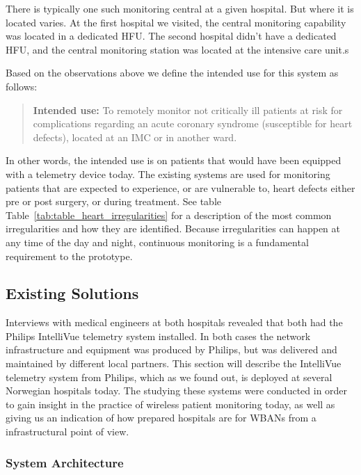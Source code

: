 There is typically one such monitoring central at a given hospital. But where it is located varies. At the first hospital we visited, the central monitoring capability was located in a dedicated HFU. The second hospital didn't have a dedicated HFU, and the central monitoring station was located at the intensive care unit.s

Based on the observations above we define the intended use for this system as follows:

\begin{quote}
\textbf{Intended use:} To remotely monitor not critically ill patients at risk for complications regarding an acute coronary syndrome (susceptible for heart defects), located at an IMC or in another ward.
\end{quote}
\noindent
In other words, the intended use is on patients that would have been equipped with a telemetry device today. The existing systems are used for monitoring patients that are expected to experience, or are vulnerable to, heart defects either pre or post surgery, or during treatment. See table Table~\ref{tab:table_heart_irregularities} for a description of the most common irregularities and how they are identified. Because irregularities can happen at any time of the day and night, continuous monitoring is a fundamental requirement to the prototype.



\subsection{Existing Solutions} %
\label{sub:existing_solutions}

Interviews with medical engineers at both hospitals revealed that both had the Philips IntelliVue telemetry system installed. In both cases the network infrastructure and equipment was produced by Philips, but was delivered and maintained by different local partners. This section will describe the IntelliVue telemetry system from Philips, which as we found out, is deployed at several Norwegian hospitals today. The studying these systems were conducted in order to gain insight in the practice of wireless patient monitoring today, as well as giving us an indication of how prepared hospitals are for WBANs from a infrastructural point of view.

\subsubsection{System Architecture} %
\label{ssub:system_architecture}

